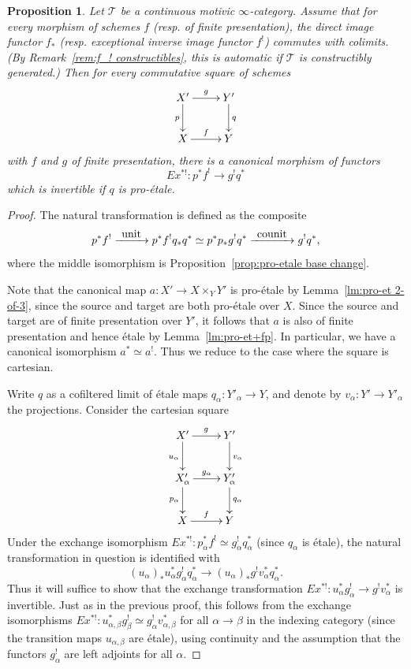 \documentclass[11pt]{article}
\newcommand{\resp}{resp.\xspace}
\numberwithin{equation}{section}\renewcommand{\encodingdefault}{TU}
\def\To#1{\mathchoice{\xrightarrow{\textstyle\kern4pt#1\kern3pt}}{\stackrel{#1}{\longrightarrow}}{}{}}
\newcommand{\T}{\mathscr T}
\newtheorem{prop}[thm]{Proposition}
\theoremstyle{remark}
\theoremstyle{definition}
\numberwithin{equation}{thm}
\begin{document}
\begin{prop}\label{prop:Ex^*! pro-etale}
Let $\T$ be a continuous motivic $\infty$-category.
Assume that for every morphism of schemes $f$ (\resp of finite presentation), the direct image functor $f_*$ (\resp exceptional inverse image functor $f^!$) commutes with colimits.
(By Remark~\ref{rem:f_! constructibles}, this is automatic if $\T$ is constructibly generated.)
Then for every commutative square of schemes
\[
\xymatrix{
X' \ar[r]^-{g}\ar[d]_{p}
& Y' \ar[d]^{q}
\\
X \ar[r]^-{f}
& Y
}
\]
with $f$ and $g$ of finite presentation, there is a canonical morphism of functors
\[
Ex^{*!} : p^*f^! \to g^!q^*
\]
which is invertible if $q$ is pro-étale.
\end{prop}
\begin{proof}
The natural transformation is defined as the composite
\[
p^*f^!
\To{\mathrm{unit}} p^*f^!q_*q^*
\simeq p^*p_*g^!q^*
\To{\mathrm{counit}}
g^!q^*,
\]
where the middle isomorphism is Proposition~\ref{prop:pro-etale base change}.

Note that the canonical map $a : X' \to X \times_Y Y'$ is pro-étale by Lemma~\ref{lm:pro-et 2-of-3}, since the source and target are both pro-étale over $X$.
Since the source and target are of finite presentation over $Y'$, it follows that $a$ is also of finite presentation and hence étale by Lemma~\ref{lm:pro-et+fp}.
In particular, we have a canonical isomorphism $a^* \simeq a^!$.
Thus we reduce to the case where the square is cartesian.

Write $q$ as a cofiltered limit of étale maps $q_\alpha : Y'_\alpha \to Y$, and denote by $v_\alpha : Y' \to Y'_\alpha$ the projections.
Consider the cartesian square
\[
\xymatrix{
X' \ar[r]^{g}\ar[d]_{u_\alpha}
& Y' \ar[d]^{v_\alpha}
\\
X'_\alpha \ar[r]^-{g_\alpha}\ar[d]_{p_\alpha}
& Y'_\alpha \ar[d]^{q_\alpha}
\\
X \ar[r]^-{f}
& Y
}
\]
Under the exchange isomorphism $Ex^{*!} : p_\alpha^*f^! \simeq g_\alpha^!q_\alpha^*$ (since $q_\alpha$ is étale), the natural transformation in question is identified with
\[
(u_\alpha)_*u_\alpha^*g_\alpha^!q_\alpha^*
\to (u_\alpha)_*g^!v_\alpha^*q_\alpha^*.
\]
Thus it will suffice to show that the exchange transformation $Ex^{*!} : u_\alpha^*g_\alpha^! \to g^!v_\alpha^*$ is invertible.
Just as in the previous proof, this follows from the exchange isomorphisms $Ex^{*!} : u_{\alpha,\beta}^*g_\beta^! \simeq g_\alpha^!v_{\alpha,\beta}^*$ for all $\alpha \to \beta$ in the indexing category (since the transition maps $u_{\alpha,\beta}$ are étale), using continuity and the assumption that the functors $g_\alpha^!$ are left adjoints for all $\alpha$.
\end{proof}
\end{document}
